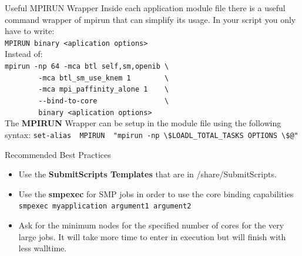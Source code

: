 \documentclass[final,t]{beamer}
\begin{document}
\begin{frame}[fragile]{}
\begin{columns}[t]
\begin{column}{.3\linewidth}
      \begin{block}{Useful MPIRUN Wrapper}
      Inside each application module file there is a useful command wrapper of mpirun that can simplify its usage.
      In your script you only have to write:\\
      \verb|MPIRUN binary <aplication options>|\\
     Instead of:\\
      \verb|mpirun -np 64 -mca btl self,sm,openib \|\\
      \verb|        -mca btl_sm_use_knem 1        \|\\
      \verb|        -mca mpi_paffinity_alone 1    \|\\
      \verb|        --bind-to-core                \|\\
      \verb|        binary <aplication options> |\\
      The \textbf{MPIRUN} Wrapper can be setup in the module file using the following syntax:
      \verb|set-alias  MPIRUN  "mpirun -np \$LOADL_TOTAL_TASKS OPTIONS \$@" |\\
      \end{block}

      \begin{block}{Recommended Best Practices}
      \begin{itemize}
         \item Use the \textbf{SubmitScripts Templates} that are in /share/SubmitScripts.
         \item Use the \textbf{smpexec} for SMP jobs in order to use the core binding capabilities\\
         \verb|smpexec myapplication argument1 argument2|\\
         \item Ask for the minimum nodes for the specified number of cores for the very large jobs. It will take more time to enter in execution but will finish with less walltime.
        \end{itemize}
      \end{block}
 


\end{column}
\end{columns}
\end{frame}
\end{document}
